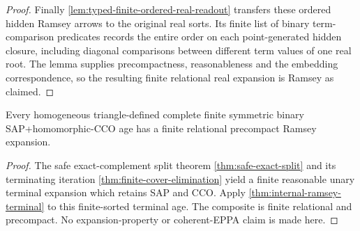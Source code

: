 \begin{proof}
Finally \cref{lem:typed-finite-ordered-real-readout} transfers these
ordered hidden Ramsey arrows to the original real sorts. Its finite
list of binary term-comparison predicates records the entire order on
each point-generated hidden closure, including diagonal comparisons
between different term values of one real root. The lemma supplies
precompactness, reasonableness and the embedding correspondence, so the
resulting finite relational real expansion is Ramsey as claimed.
\end{proof}

\begin{theorem}
\label{thm:internal-v27-general-ramsey}
Every homogeneous triangle-defined complete finite symmetric binary
SAP+homomorphic-CCO age has a finite relational precompact Ramsey expansion.
\end{theorem}
\begin{proof}
The safe exact-complement split theorem
\cref{thm:safe-exact-split} and its terminating iteration
\cref{thm:finite-cover-elimination} yield a finite reasonable unary
terminal expansion which retains SAP and CCO. Apply
\cref{thm:internal-ramsey-terminal} to this finite-sorted terminal age.
The composite is finite relational and precompact. No expansion-property
or coherent-EPPA claim is made here.
\end{proof}
